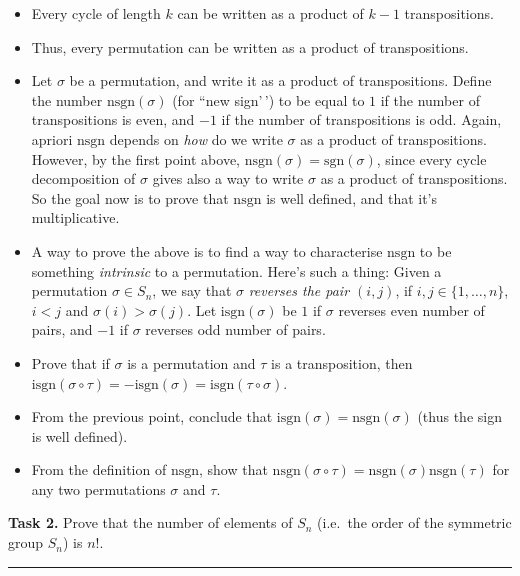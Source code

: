 \documentclass[
  12pt,
  a4paper,
  twoside]{article}
\providecommand{\tightlist}{%
  \setlength{\itemsep}{0pt}\setlength{\parskip}{0pt}}
\theoremstyle{plain}
\theoremstyle{definition}
\begin{document}
\begin{itemize}
\tightlist
\item
  Every cycle of length \(k\) can be written as a product of \(k-1\)
  transpositions.
\item
  Thus, every permutation can be written as a product of transpositions.
\item
  Let \(\sigma\) be a permutation, and write it as a product of transpositions.
  Define the number \(\mathrm{nsgn}(\sigma)\) (for ``new sign'\,') to be equal to
  \(1\) if the number of transpositions is even, and \(-1\) if the number of
  transpositions is odd. Again, apriori \(\mathrm{nsgn}\) depends on \emph{how}
  do we write \(\sigma\) as a product of transpositions. However, by the first
  point above, \(\mathrm{nsgn}(\sigma)=\mathrm{sgn}(\sigma)\), since every
  cycle decomposition of \(\sigma\) gives also a way to write \(\sigma\) as a
  product of transpositions. So the goal now is to prove that \(\mathrm{nsgn}\)
  is well defined, and that it's multiplicative.
\item
  A way to prove the above is to find a way to characterise \(\mathrm{nsgn}\)
  to be something \emph{intrinsic} to a permutation. Here's such a thing:
  Given a permutation \(\sigma\in S_n\), we say that \(\sigma\) \emph{reverses
  the pair \((i,j)\)}, if \(i,j\in\{1,\dots,n\}\), \(i<j\) and
  \(\sigma(i)>\sigma(j)\). Let \(\mathrm{isgn}(\sigma)\) be \(1\) if \(\sigma\)
  reverses even number of pairs, and \(-1\) if \(\sigma\) reverses odd number of
  pairs.
\item
  Prove that if \(\sigma\) is a permutation and \(\tau\) is a transposition, then
  \(\mathrm{isgn}(\sigma\circ\tau)=-\mathrm{isgn}(\sigma)=\mathrm{isgn}(\tau\circ\sigma)\).
\item
  From the previous point, conclude that
  \(\mathrm{isgn}(\sigma)=\mathrm{nsgn}(\sigma)\) (thus the sign is well
  defined).
\item
  From the definition of \(\mathrm{nsgn}\), show that
  \(\mathrm{nsgn}(\sigma\circ\tau)=\mathrm{nsgn}(\sigma)\mathrm{nsgn}(\tau)\)
  for any two permutations \(\sigma\) and \(\tau\).
\end{itemize}

\textbf{Task 2.} Prove that the number of elements of \(S_n\) (i.e.~the order of the
symmetric group \(S_n\)) is \(n!\).

\begin{center}\rule{0.5\linewidth}{0.5pt}\end{center}
\end{document}
